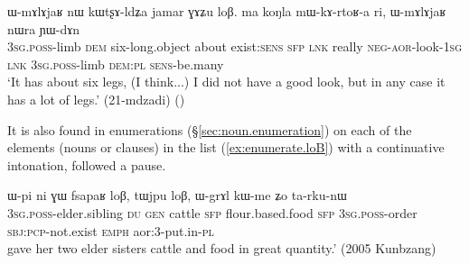 \begin{exe} 
\ex \label{ex:GAZu.loB}
\gll  ɯ-mɤlɤjaʁ nɯ kɯtʂɤ-ldʑa jamar ɣɤʑu loβ. ma koŋla mɯ-kɤ-rtoʁ-a ri, ɯ-mɤlɤjaʁ nɯra ɲɯ-dɤn \\
 \textsc{3sg}.\textsc{poss}-limb \textsc{dem} six-long.object about exist:\textsc{sens} \textsc{sfp} \textsc{lnk} really \textsc{neg}-\textsc{aor}-look-\textsc{1sg} \textsc{lnk}  \textsc{3sg}.\textsc{poss}-limb \textsc{dem}:\textsc{pl} \textsc{sens}-be.many \\
 \glt `It has about six legs, (I think...) I did not have a good look, but in any case it has a lot of legs.' (21-mdzadi) 	()
 \end{exe} 

It is also found in enumerations (§\ref{sec:noun.enumeration}) on each of the elements (nouns or clauses) in the list (\ref{ex:enumerate.loB}) with a continuative intonation, followed a pause.

\begin{exe} 
\ex \label{ex:enumerate.loB}
\gll ɯ-pi ni ɣɯ  fsapaʁ loβ, tɯjpu loβ, ɯ-grɤl kɯ-me ʑo ta-rku-nɯ \\
\textsc{3sg}.\textsc{poss}-elder.sibling \textsc{du} \textsc{gen} cattle \textsc{sfp} flour.based.food  \textsc{sfp} \textsc{3sg}.\textsc{poss}-order \textsc{sbj}:\textsc{pcp}-not.exist \textsc{emph} aor:3\flobv{}-put.in-\textsc{pl} \\
 gave her two elder sisters cattle and food in great quantity.' (2005 Kunbzang)
 \end{exe} 

 
